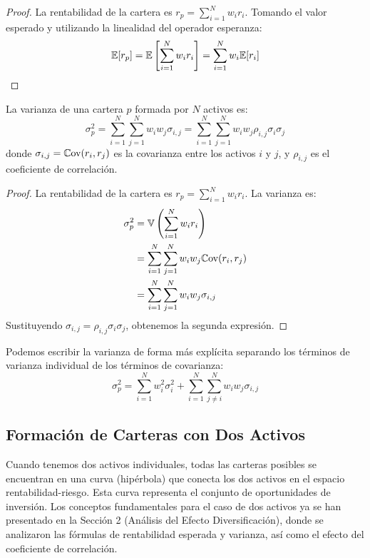 \begin{proof}
La rentabilidad de la cartera es $r_p = \sum_{i=1}^{N} w_i r_i$. Tomando el valor esperado y utilizando la linealidad del operador esperanza:
$$\mathbb{E}[r_p] = \mathbb{E}\left[\sum_{i=1}^{N} w_i r_i\right] = \sum_{i=1}^{N} w_i \mathbb{E}[r_i]$$
\end{proof}

\begin{teorema}
La varianza de una cartera $p$ formada por $N$ activos es:
\begin{equation}
\sigma_p^2 = \sum_{i=1}^{N} \sum_{j=1}^{N} w_i w_j \sigma_{i,j} = \sum_{i=1}^{N} \sum_{j=1}^{N} w_i w_j \rho_{i,j} \sigma_i \sigma_j
\end{equation}
donde $\sigma_{i,j} = \mathbb{C}\text{ov}(r_i, r_j)$ es la covarianza entre los activos $i$ y $j$, y $\rho_{i,j}$ es el coeficiente de correlación.
\end{teorema}

\begin{proof}
La rentabilidad de la cartera es $r_p = \sum_{i=1}^{N} w_i r_i$. La varianza es:
\begin{align*}
\sigma_p^2 &= \mathbb{V}\left(\sum_{i=1}^{N} w_i r_i\right) \\
&= \sum_{i=1}^{N} \sum_{j=1}^{N} w_i w_j \mathbb{C}\text{ov}(r_i, r_j) \\
&= \sum_{i=1}^{N} \sum_{j=1}^{N} w_i w_j \sigma_{i,j}
\end{align*}
Sustituyendo $\sigma_{i,j} = \rho_{i,j} \sigma_i \sigma_j$, obtenemos la segunda expresión.
\end{proof}

Podemos escribir la varianza de forma más explícita separando los términos de varianza individual de los términos de covarianza:
\begin{equation}
\sigma_p^2 = \sum_{i=1}^{N} w_i^2 \sigma_i^2 + \sum_{i=1}^{N} \sum_{j \neq i}^{N} w_i w_j \sigma_{i,j}
\end{equation}

\subsection{Formación de Carteras con Dos Activos}

Cuando tenemos dos activos individuales, todas las carteras posibles se encuentran en una curva (hipérbola) que conecta los dos activos en el espacio rentabilidad-riesgo. Esta curva representa el conjunto de oportunidades de inversión. Los conceptos fundamentales para el caso de dos activos ya se han presentado en la Sección 2 (Análisis del Efecto Diversificación), donde se analizaron las fórmulas de rentabilidad esperada y varianza, así como el efecto del coeficiente de correlación.

